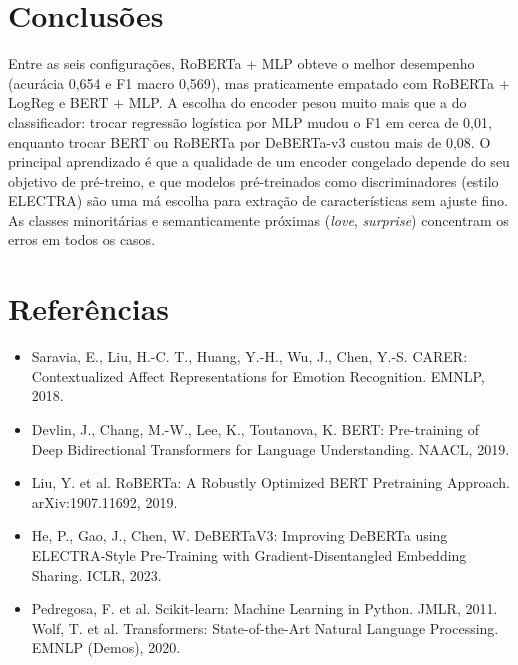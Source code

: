 \documentclass[11pt,a4paper]{article}
\begin{document}
\section{Conclusões}

Entre as seis configurações, RoBERTa + MLP obteve o melhor desempenho (acurácia 0,654 e F1 macro 0,569), mas praticamente empatado com RoBERTa + LogReg e BERT + MLP. A escolha do encoder pesou muito mais que a do classificador: trocar regressão logística por MLP mudou o F1 em cerca de 0,01, enquanto trocar BERT ou RoBERTa por DeBERTa-v3 custou mais de 0,08. O principal aprendizado é que a qualidade de um encoder congelado depende do seu objetivo de pré-treino, e que modelos pré-treinados como discriminadores (estilo ELECTRA) são uma má escolha para extração de características sem ajuste fino. As classes minoritárias e semanticamente próximas (\textit{love}, \textit{surprise}) concentram os erros em todos os casos.

\section*{Referências}
\small
\begin{itemize}[leftmargin=*]
\item Saravia, E., Liu, H.-C. T., Huang, Y.-H., Wu, J., Chen, Y.-S. CARER: Contextualized Affect Representations for Emotion Recognition. EMNLP, 2018.
\item Devlin, J., Chang, M.-W., Lee, K., Toutanova, K. BERT: Pre-training of Deep Bidirectional Transformers for Language Understanding. NAACL, 2019.
\item Liu, Y. et al. RoBERTa: A Robustly Optimized BERT Pretraining Approach. arXiv:1907.11692, 2019.
\item He, P., Gao, J., Chen, W. DeBERTaV3: Improving DeBERTa using ELECTRA-Style Pre-Training with Gradient-Disentangled Embedding Sharing. ICLR, 2023.
\item Pedregosa, F. et al. Scikit-learn: Machine Learning in Python. JMLR, 2011. Wolf, T. et al. Transformers: State-of-the-Art Natural Language Processing. EMNLP (Demos), 2020.
\end{itemize}
\end{document}
